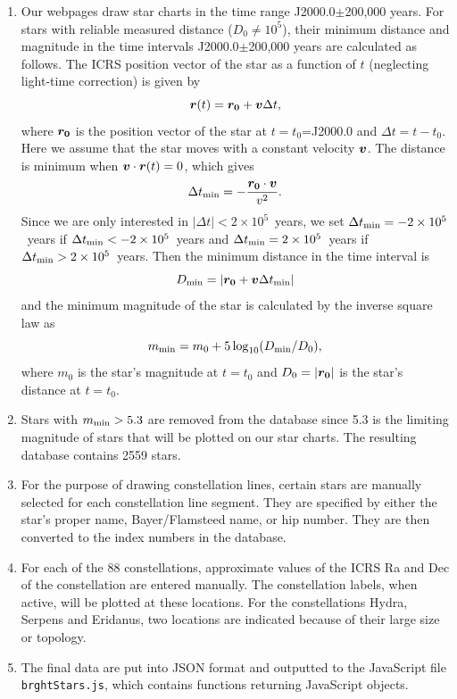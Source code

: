 \documentclass[12pt]{article}
\newcommand \beq {\begin{equation}}
\newcommand \eeq {\end{equation}}
\newcommand{\ve}[1]{\mbox{\boldmath $#1$}}
\begin{document}
\begin{enumerate}
\item Our webpages draw star charts in the time range J2000.0$\pm$200,000 years. 
For stars with reliable measured distance ($D_0 \neq 10^5$), their minimum 
distance and magnitude in the time intervals J2000.0$\pm$200,000 years are 
calculated as follows. The ICRS position vector of the star as a function of $t$ 
(neglecting light-time correction) is given by 
\beq
  \ve{r}(t) = \ve{r_0} + \ve{v} \Delta t ,
\eeq
where $\ve{r_0}$ is the position vector of the star at $t=t_0$=J2000.0 and 
$\Delta t = t-t_0$. Here we assume that the star moves with a constant 
velocity $\ve{v}$. The distance is minimum when $\ve{v}\cdot \ve{r}(t)=0$, 
which gives 
\beq
  \Delta t_{\rm min} = -\frac{\ve{r_0}\cdot \ve{v}}{v^2} .
\eeq
Since we are only interested in $|\Delta t|<2\times 10^5$~years, we set 
$\Delta t_{\rm min} =-2\times 10^5$~years if $\Delta t_{\rm min}< -2\times 10^5$~years  
and $\Delta t_{\rm min} =2\times 10^5$~years if $\Delta t_{\rm min}> 2\times 10^5$~years. 
Then the minimum distance in the time interval is 
\beq
  D_{\rm min} = |\ve{r_0} + \ve{v} \Delta t_{\rm min}| 
\eeq
and the minimum magnitude of the star is calculated by the inverse square law as 
\beq
  m_{\rm min} = m_0 + 5 \log_{10} (D_{\rm min}/D_0) , 
\eeq
where $m_0$ is the star's magnitude at $t=t_0$ and $D_0=|\ve{r_0}|$ is 
the star's distance at $t=t_0$.

\item Stars with $m_{\rm min} > 5.3$ are removed from the database 
since 5.3 is the limiting magnitude of stars that will be plotted on 
our star charts. The resulting database contains 2559 stars.

\item For the purpose of drawing constellation lines, certain stars 
are manually selected for each constellation line segment. They 
are specified by either the star's proper name, Bayer/Flamsteed name, 
or hip number. They are then converted to the index numbers in the database. 

\item For each of the 88 constellations, approximate values of the ICRS 
Ra and Dec of the constellation are entered manually. The constellation labels, 
when active, will be plotted at these locations. For the constellations Hydra, 
Serpens and Eridanus, two locations are indicated because of their large size 
or topology.

\item The final data are put into JSON format and outputted 
to the JavaScript file {\tt brghtStars.js}, which contains functions returning 
JavaScript objects.
\end{enumerate}
\end{document}
